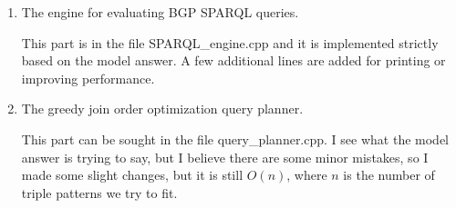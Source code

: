 \documentclass{article}
\begin{document}
\begin{enumerate}
\begin{enumerate}
3) To match the patterns like $\langle X, Y, Z\rangle$, the paper suggests to iterate over the triple table; if we want $X = Y$,  we skip those $X\neq Y$. I modify this a little bit to improve the efficiency. Again, $\langle X, X, Z\rangle$, for example, we first iterate $I_s$, and for each $s$ in $I_s$, we find if $I_{sp}$ includes hash($s, s$), if yes, we traverse over the triple table. As shown in the pseudo-code in Algorithm \eqref{alg:evaluateXXP}\footnote{The actual implementation is slightly different. I put the check of if $i$ in $I_{sp}$ at the begging of the Evaluate\_SPZ to reduce some code redundancy, but they are equivalent.}.

\begin{algorithm}[H]
\caption{Evaluate $\langle X, X, Z\rangle$}\label{alg:evaluateXXP}
\begin{algorithmic}
\State $i = $ hash($s, s$)
\State Evaluate\_SPZ($s, s$)
\EndIf
\EndFor
\end{algorithmic}
\end{algorithm}

$\langle X, Y, Y\rangle$ and $\langle X, Y, X\rangle$ are similar. For $\langle X, X, X\rangle$, we only need to traverse  $s$ in $I_s$ and find if $\langle s, s, s\rangle$ is in $I_{spo}$ as shown in  Algorithm \eqref{alg:evaluateXXX}.

\begin{algorithm}[H]
\caption{Evaluate $\langle X, X, X\rangle$}\label{alg:evaluateXXX}
\begin{algorithmic}
\State Evaluate\_SPO($s, s, s$) 
\EndFor
\end{algorithmic}
\end{algorithm}

\item The engine for evaluating BGP SPARQL queries.

This part is in the file SPARQL\_engine.cpp and it is implemented strictly based on the model answer. A few additional lines are added for printing or improving performance.

\item The greedy join order optimization query planner.

This part can be sought in the file query\_planner.cpp. I see what the model answer is trying to say, but I believe there are some minor mistakes, so I made some slight changes, but it is still $O(n)$, where $n$ is the number of triple patterns we try to fit. 


\end{enumerate}
\end{enumerate}
\end{document}
